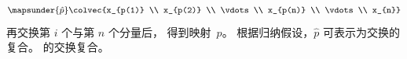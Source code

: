 \begin{exercises}
\begin{answer}
\begin{equation*}
        \mapsunder{\hat{p}}
        \colvec{x_{p(1)} \\ x_{p(2)} \\ \vdots \\ x_{p(n)} \\ \vdots  \\ x_{n}}
      \end{equation*}
      再交换第 $i$ 个与第 $n$ 个分量后，
      得到映射~$p$。
      根据归纳假设，$\hat{p}$ 可表示为交换的复合。
      的交换复合。
    \end{answer}
\end{exercises}
\endinput
